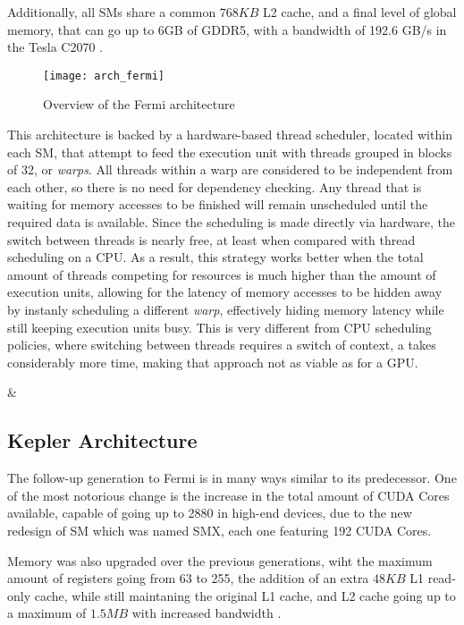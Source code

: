 \documentclass[main.tex]{subfiles}
\begin{document}
Additionally, all \acsp{SM} share a common $768KB$ L2 cache, and a final level of global memory, that can go up to 6GB of GDDR5, with a bandwidth of 192.6 GB/s in the Tesla C2070 \cite{NVIDIA:fermi}.

\begin{figure}[!htp]
  \centering
  \texttt{[image: arch\_fermi]}
  \caption{Overview of the Fermi architecture \label{fig:fermi}}
\end{figure}

This architecture is backed by a hardware-based thread scheduler, located within each \acs{SM}, that attempt to feed the execution unit with threads grouped in blocks of 32, or \textit{warps}. All threads within a warp are considered to be independent from each other, so there is no need for dependency checking. Any thread that is waiting for memory accesses to be finished will remain unscheduled until the required data is available. Since the scheduling is made directly via hardware, the switch between threads is nearly free, at least when compared with thread scheduling on a \acs{CPU}. As a result, this strategy works better when the total amount of threads competing for resources is much higher than the amount of execution units, allowing for the latency of memory accesses to be hidden away by instanly scheduling a different \textit{warp}, effectively hiding memory latency while still keeping execution units busy. This is very different from \acs{CPU} scheduling policies, where switching between threads requires a switch of context, a takes considerably more time, making that approach not as viable as for a \acs{GPU}.



&%
\subsection{\nvidia Kepler Architecture}

The follow-up generation to Fermi is in many ways similar to its predecessor. One of the most notorious change is the increase in the total amount of \acs{CUDA} Cores available, capable of going up to 2880 in high-end devices, due to the new redesign of \acl{SM} which was named \acs{SMX}, each one featuring 192 \acs{CUDA} Cores.

Memory was also upgraded over the previous generations, wiht the maximum amount of registers going from 63 to 255, the addition of an extra $48KB$ L1 read-only cache, while still maintaning the original L1 cache, and L2 cache going up to a maximum of $1.5MB$ with increased bandwidth \cite{NVIDIA:kepler}.
\end{document}
